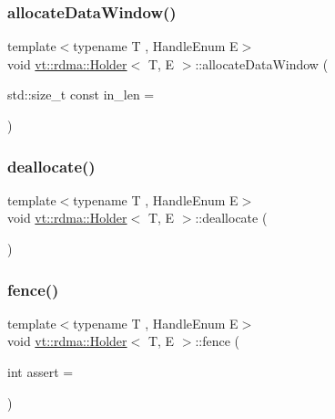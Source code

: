 \mbox{\label{structvt_1_1rdma_1_1_holder_a7dc5e735fb6f919dabec8e118683b4ae}} 
\subsubsection{\texorpdfstring{allocate\+Data\+Window()}{allocateDataWindow()}}
{\footnotesize\ttfamily template$<$typename T , Handle\+Enum E$>$ \\
void \hyperlink{structvt_1_1rdma_1_1_holder}{vt\+::rdma\+::\+Holder}$<$ T, E $>$\+::allocate\+Data\+Window (\begin{DoxyParamCaption}\item[{std\+::size\+\_\+t const}]{in\+\_\+len = {} }\end{DoxyParamCaption})\hspace{0.3cm}{\ttfamily [private]}}

\mbox{\label{structvt_1_1rdma_1_1_holder_afe6dd03862a68f941a44258aac9ef03d}} 
\subsubsection{\texorpdfstring{deallocate()}{deallocate()}}
{\footnotesize\ttfamily template$<$typename T , Handle\+Enum E$>$ \\
void \hyperlink{structvt_1_1rdma_1_1_holder}{vt\+::rdma\+::\+Holder}$<$ T, E $>$\+::deallocate (\begin{DoxyParamCaption}{ }\end{DoxyParamCaption})}

\mbox{\label{structvt_1_1rdma_1_1_holder_ae0131450f2f087c80faa444810aa25ed}} 
\subsubsection{\texorpdfstring{fence()}{fence()}}
{\footnotesize\ttfamily template$<$typename T , Handle\+Enum E$>$ \\
void \hyperlink{structvt_1_1rdma_1_1_holder}{vt\+::rdma\+::\+Holder}$<$ T, E $>$\+::fence (\begin{DoxyParamCaption}\item[{int}]{assert = {} }\end{DoxyParamCaption})}

